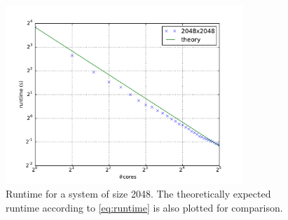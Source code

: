 \begin{figure}
	\centering
		\includegraphics[width=0.80\textwidth]{../img/scalingTheory.pdf}
	\caption{Runtime for a system of size 2048. The theoretically expected runtime according to \autoref{eq:runtime} is also plotted for comparison.}
	\label{fig:scalingTheory}
\end{figure}
